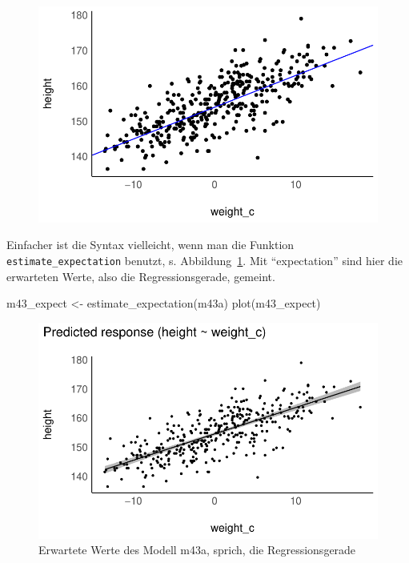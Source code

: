 \documentclass[
  a4paper,
  DIV=11]{scrreprt}
\newenvironment{Shaded}{\begin{snugshade}}{\end{snugshade}}
\newcommand{\FunctionTok}[1]{\textcolor[rgb]{0.28,0.35,0.67}{#1}}
\newcommand{\NormalTok}[1]{\textcolor[rgb]{0.00,0.23,0.31}{#1}}
\newcommand{\OtherTok}[1]{\textcolor[rgb]{0.00,0.23,0.31}{#1}}
\theoremstyle{definition}
\theoremstyle{remark}
\begin{document}
\begin{figure}[H]

{\centering \includegraphics{./lineare-modelle_files/figure-pdf/Post-Regression-befragen-6-1.pdf}

}

\end{figure}

Einfacher ist die Syntax vielleicht, wenn man die Funktion
\texttt{estimate\_expectation} benutzt, s.
Abbildung~\ref{fig-expect-m43a}. Mit ``expectation'' sind hier die
erwarteten Werte, also die Regressionsgerade, gemeint.

\begin{Shaded}
\begin{Highlighting}[]
\NormalTok{m43\_expect }\OtherTok{\textless{}{-}} \FunctionTok{estimate\_expectation}\NormalTok{(m43a)}
\FunctionTok{plot}\NormalTok{(m43\_expect)}
\end{Highlighting}
\end{Shaded}

\begin{figure}[H]

{\centering \includegraphics{./lineare-modelle_files/figure-pdf/fig-expect-m43a-1.pdf}

}

\caption{\label{fig-expect-m43a}Erwartete Werte des Modell m43a, sprich,
die Regressionsgerade}

\end{figure}
\end{document}
